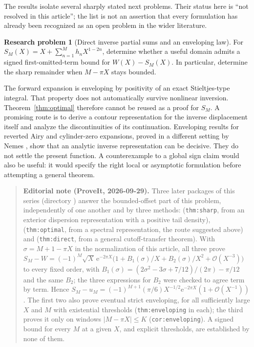 \documentclass[11pt,a4paper]{article}
\theoremstyle{definition}
\newtheorem{problem}{Research problem}
\numberwithin{equation}{section}
\newcommand{\ee}{\mathrm{e}}
\newcommand{\Oh}{\mathcal O}
\begin{document}
The results isolate several sharply stated next problems. Their status here is ``not resolved in this article''; the list is not an assertion that every formulation has already been recognized as an open problem in the wider literature.

\begin{problem}[Direct inverse partial sums and an enveloping law]
\label{prob:direct}
For $S_M(X)=X+\sum_{n=1}^Mh_nX^{1-2n}$, determine whether a useful domain admits a signed first-omitted-term bound for $W(X)-S_M(X)$. In particular, determine the sharp remainder when $M-\pi X$ stays bounded.
\end{problem}
The forward expansion is enveloping by positivity of an exact Stieltjes-type integral. That property does not automatically survive nonlinear inversion. Theorem~\ref{thm:optimal} therefore cannot be reused as a proof for $S_M$. A promising route is to derive a contour representation for the inverse displacement itself and analyze the discontinuities of its continuation. Enveloping results for reverted Airy and cylinder-zero expansions, proved in a different setting by Nemes \cite{nemes}, show that an analytic inverse representation can be decisive. They do not settle the present function. A counterexample to a global sign claim would also be useful: it would specify the right local or asymptotic formulation before attempting a general theorem.

\begin{quote}\small\textbf{Editorial note (ProveIt, 2026-09-29).} Three later packages of this series (directory ) answer the bounded-offset part of this problem, independently of one another and by three methods:  (\texttt{thm:sharp}, from an exterior dispersion representation with a positive tail density),  (\texttt{thm:optimal}, from a spectral representation, the route suggested above) and  (\texttt{thm:direct}, from a general cutoff-transfer theorem). With $\sigma=M+1-\pi X$ in the normalization of this article, all three prove $S_M-W=(-1)^M\sqrt X\,\ee^{-2\pi X}\bigl(1+B_1(\sigma)/X+B_2(\sigma)/X^2+\Oh(X^{-3})\bigr)$ to every fixed order, with $B_1(\sigma)=(2\sigma^2-3\sigma+7/12)/(2\pi)-\pi/12$ and the same $B_2$; the three expressions for $B_2$ were checked to agree term by term. Hence $S_M-u_M=(-1)^{M+1}(\pi/6)X^{-1/2}\ee^{-2\pi X}(1+\Oh(X^{-1}))$. The first two also prove eventual strict enveloping, for all sufficiently large $X$ and $M$ with existential thresholds (\texttt{thm:enveloping} in each); the third proves it only on windows $|M-\pi X|\le K$ (\texttt{cor:enveloping}). A signed bound for every $M$ at a given $X$, and explicit thresholds, are established by none of them.\end{quote}
\end{document}
